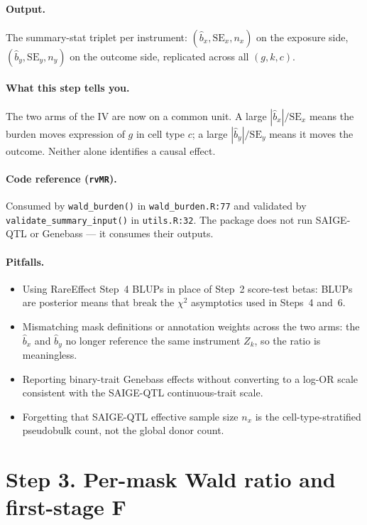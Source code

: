 \documentclass[11pt]{article}
\begin{document}
\paragraph{Output.} The summary-stat triplet per instrument: $(\hat b_x, \mathrm{SE}_x, n_x)$ on the exposure side, $(\hat b_y, \mathrm{SE}_y, n_y)$ on the outcome side, replicated across all $(g,k,c)$.

\paragraph{What this step tells you.} The two arms of the IV are now on a common unit. A large $|\hat b_x|/\mathrm{SE}_x$ means the burden moves expression of $g$ in cell type $c$; a large $|\hat b_y|/\mathrm{SE}_y$ means it moves the outcome. Neither alone identifies a causal effect.

\paragraph{Code reference (\texttt{rvMR}).} Consumed by \verb|wald_burden()| in \verb|wald_burden.R:77| and validated by \verb|validate_summary_input()| in \verb|utils.R:32|. The package does not run SAIGE-QTL or Genebass --- it consumes their outputs.

\paragraph{Pitfalls.}
\begin{itemize}
\item Using RareEffect Step~4 BLUPs in place of Step~2 score-test betas: BLUPs are posterior means that break the $\chi^2$ asymptotics used in Steps~4 and~6.
\item Mismatching mask definitions or annotation weights across the two arms: the $\hat b_x$ and $\hat b_y$ no longer reference the same instrument $Z_k$, so the ratio is meaningless.
\item Reporting binary-trait Genebass effects without converting to a log-OR scale consistent with the SAIGE-QTL continuous-trait scale.
\item Forgetting that SAIGE-QTL effective sample size $n_x$ is the cell-type-stratified pseudobulk count, not the global donor count.
\end{itemize}

\section*{Step 3. Per-mask Wald ratio and first-stage F}
\end{document}
